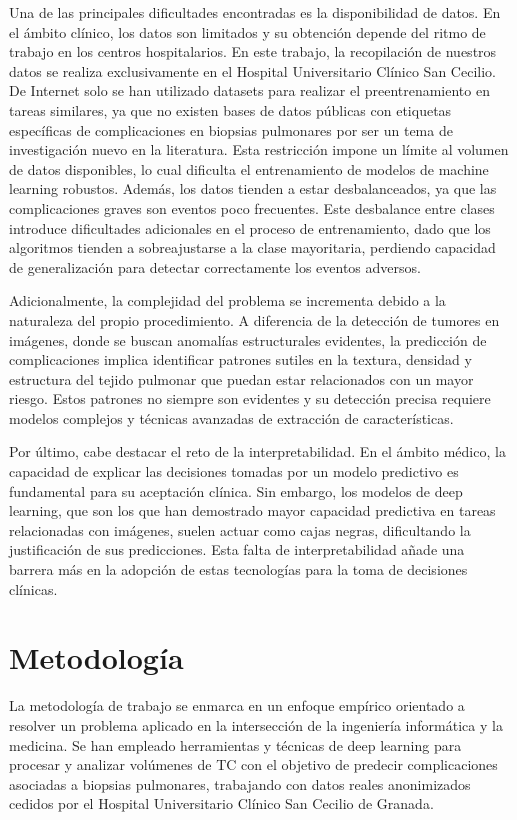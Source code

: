 Una de las principales dificultades encontradas es la disponibilidad de datos. En el ámbito clínico, los datos son limitados y su obtención depende del ritmo de trabajo en los centros hospitalarios. En este trabajo, la recopilación de nuestros datos se realiza exclusivamente en el Hospital Universitario Clínico San Cecilio. De Internet solo se han utilizado datasets para realizar el preentrenamiento en tareas similares, ya que no existen bases de datos públicas con etiquetas específicas de complicaciones en biopsias pulmonares por ser un tema de investigación nuevo en la literatura. Esta restricción impone un límite al volumen de datos disponibles, lo cual dificulta el entrenamiento de modelos de machine learning robustos. Además, los datos tienden a estar desbalanceados, ya que las complicaciones graves son eventos poco frecuentes. Este desbalance entre clases introduce dificultades adicionales en el proceso de entrenamiento, dado que los algoritmos tienden a sobreajustarse a la clase mayoritaria, perdiendo capacidad de generalización para detectar correctamente los eventos adversos.

Adicionalmente, la complejidad del problema se incrementa debido a la naturaleza del propio procedimiento. A diferencia de la detección de tumores en imágenes, donde se buscan anomalías estructurales evidentes, la predicción de complicaciones implica identificar patrones sutiles en la textura, densidad y estructura del tejido pulmonar que puedan estar relacionados con un mayor riesgo. Estos patrones no siempre son evidentes y su detección precisa requiere modelos complejos y técnicas avanzadas de extracción de características.

Por último, cabe destacar el reto de la interpretabilidad. En el ámbito médico, la capacidad de explicar las decisiones tomadas por un modelo predictivo es fundamental para su aceptación clínica. Sin embargo, los modelos de deep learning, que son los que han demostrado mayor capacidad predictiva en tareas relacionadas con imágenes, suelen actuar como cajas negras, dificultando la justificación de sus predicciones. Esta falta de interpretabilidad añade una barrera más en la adopción de estas tecnologías para la toma de decisiones clínicas. 

\section{Metodología}

La metodología de trabajo se enmarca en un enfoque empírico orientado a resolver un problema aplicado en la intersección de la ingeniería informática y la medicina. Se han empleado herramientas y técnicas de deep learning para procesar y analizar volúmenes de TC con el objetivo de predecir complicaciones asociadas a biopsias pulmonares, trabajando con datos reales anonimizados cedidos por el Hospital Universitario Clínico San Cecilio de Granada.


